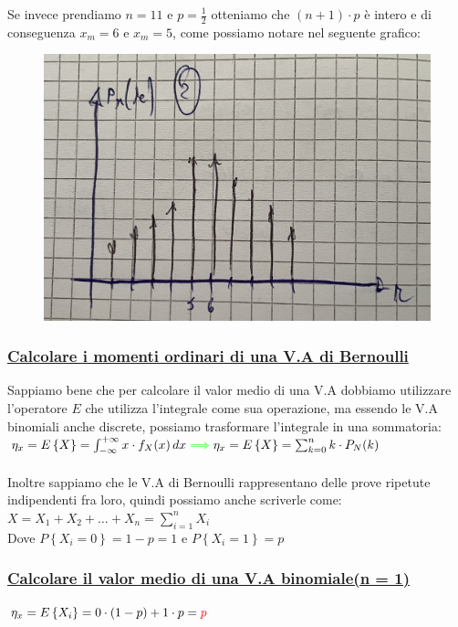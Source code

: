 \documentclass{article}
\begin{document}
Se invece prendiamo $n = 11$ e $p = \frac 12$ otteniamo che $(n+1)\cdot p$ è intero e di conseguenza $x_m = 6 $ e $x_m = 5$, come possiamo notare nel seguente grafico:
\begin{figure}[ht]
\centering
\includegraphics[scale=0.10]{images/65.ModaBinDeltaInt.jpeg}
\end{figure}
\subsubsection{\underline{Calcolare i momenti ordinari di una V.A di Bernoulli}}
Sappiamo bene che per calcolare il valor medio di una V.A dobbiamo utilizzare l’operatore $E$ che utilizza l’integrale come sua operazione, ma essendo le V.A binomiali anche discrete, possiamo trasformare l’integrale in una sommatoria: \\
$\eta_x = E\left\{X\right\} =\int_{-\infty}^{+\infty} x \cdot f_X(x) \,dx
{\color{green} \implies}
\eta_x = E\left\{X\right\} =\sum_{k=0}^{n} k \cdot P_N(k)$ \\ \\
Inoltre sappiamo che le V.A di Bernoulli rappresentano delle prove ripetute indipendenti fra loro, quindi possiamo anche scriverle come: \\
$X = X_1 + X_2 + \dots +X_n = \sum_{i=1}^{n} X_i$ \\
Dove $P \left\{X_i=0\right\} = 1-p = 1$ e $P \left\{X_i = 1 \right\} = p$
\subsubsection{\underline{Calcolare il valor medio di una V.A binomiale(n = 1)}}
$\eta_x = E \left\{ X_i \right\} = 0 \cdot (1-p) + 1 \cdot p = \color{red}p$
\end{document}
